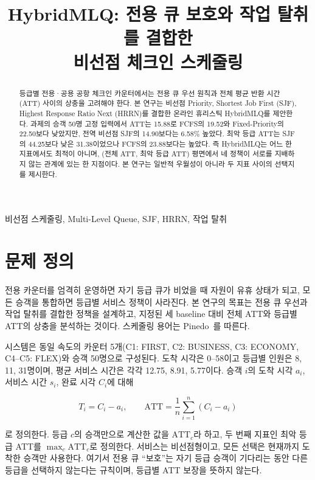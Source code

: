 \documentclass[conference]{IEEEtran}
\title{HybridMLQ: 전용 큐 보호와 작업 탈취를 결합한\\
비선점 체크인 스케줄링}
\author{}
\begin{document}
\maketitle
\suppressfloats[t]

\begin{abstract}
등급별 전용·공용 공항 체크인 카운터에서는 전용 큐 우선 원칙과 전체 평균
반환 시간(ATT) 사이의 상충을 고려해야 한다. 본 연구는 비선점 Priority,
Shortest Job First (SJF), Highest Response Ratio Next (HRRN)를 결합한
온라인 휴리스틱 HybridMLQ를 제안한다. 과제의 승객 50명 고정 입력에서 ATT는
15.88로 FCFS의 19.52와 Fixed-Priority의 22.50보다 낮았지만, 전역 비선점
SJF의 14.90보다는 6.58\% 높았다. 최악 등급 ATT는 SJF의 44.25보다 낮은
31.38이었으나 FCFS의 23.88보다는 높았다. 즉 HybridMLQ는 어느 한 지표에서도
최적이 아니며, (전체 ATT, 최악 등급 ATT) 평면에서 네 정책이 서로를 지배하지
않는 관계에 있는 한 지점이다. 본 연구는 일반적 우월성이 아니라 두 지표
사이의 선택지를 제시한다.
\end{abstract}

\begin{IEEEkeywords}
비선점 스케줄링, Multi-Level Queue, SJF, HRRN, 작업 탈취
\end{IEEEkeywords}

\section{문제 정의}

전용 카운터를 엄격히 운영하면 자기 등급 큐가 비었을 때 자원이 유휴 상태가
되고, 모든 승객을 통합하면 등급별 서비스 정책이 사라진다. 본 연구의 목표는
전용 큐 우선과 작업 탈취를 결합한 정책을 설계하고, 지정된 세 baseline 대비
전체 ATT와 등급별 ATT의 상충을 분석하는 것이다. 스케줄링 용어는
Pinedo~\cite{pinedo}를 따른다.

시스템은 동일 속도의 카운터 5개(C1: FIRST, C2: BUSINESS, C3: ECONOMY,
C4--C5: FLEX)와 승객 50명으로 구성된다. 도착 시각은 0--58이고 등급별
인원은 8, 11, 31명이며, 평균 서비스 시간은 각각 12.75, 8.91, 5.77이다.
승객 $i$의 도착 시각 $a_i$, 서비스 시간 $s_i$, 완료 시각 $C_i$에 대해

\begin{equation}
T_i=C_i-a_i, \qquad
\mathrm{ATT}=\frac{1}{n}\sum_{i=1}^{n}(C_i-a_i)
\label{eq:att}
\end{equation}

로 정의한다. 등급 $c$의 승객만으로 계산한 값을 $\mathrm{ATT}_c$라 하고,
두 번째 지표인 최악 등급 ATT를 $\max_{c}\mathrm{ATT}_c$로 정의한다.
서비스는 비선점형이고, 모든 선택은 현재까지 도착한 승객만 사용한다. 여기서
전용 큐 ``보호''는 자기 등급 승객이 기다리는 동안 다른 등급을 선택하지
않는다는 규칙이며, 등급별 ATT 보장을 뜻하지 않는다.
\end{document}
